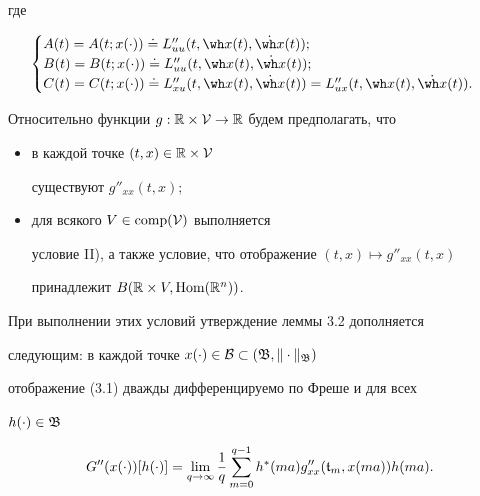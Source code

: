где


\begin{equation}


\begin{cases}


A(t)=A(t;x(\cdot))\doteq L''_{uu}(t,\wh


x(t),\Dot{\wh x}(t)); \\


B(t)=B(t;x(\cdot))\doteq L''_{uu}(t,\wh


x(t),\Dot{\wh x}(t)); \\


C(t)=C(t;x(\cdot))\doteq L''_{xu}(t,\wh


x(t),\Dot{\wh x}(t))=


L''_{ux}(t,\wh x(t),\Dot{\wh x}(t)).


\end{cases}


\end{equation}





Относительно функции $g:\Bbb R\times\cal V\to\Bbb


R$ будем предполагать, что


\begin{itemize}


\item[I${}'$)] в каждой точке $(t,x)\in\Bbb R\times\cal V$


существуют $g''_{xx}(t,x);$


\item[II${}'$)] для всякого $V\in\operatorname{comp}(\cal V)$ выполняется


условие II), а также условие, что отображение $(t,x)\mapsto g''_{xx}(t,x)$


принадлежит $B(\Bbb R\times V,\operatorname{Hom}(\Bbb R^n))$.


\end{itemize}





При выполнении этих условий утверждение леммы 3.2 дополняется


следующим: в каждой точке $x(\cdot)\in\cal


B\subset(\frak B,\|\cdot\|_{\frak B})$


отображение (3.1) дважды дифференцируемо по Фреше и для всех


$h(\cdot)\in\frak B$


\begin{equation}


G''(x(\cdot))[h(\cdot)]=\lim_{q\to\infty}\frac{1}{q}


\sum_{m=0}^{q-1}h^{*}(ma)g''_{xx}({\frak t}_m,x(ma))h(ma).


\end{equation}





